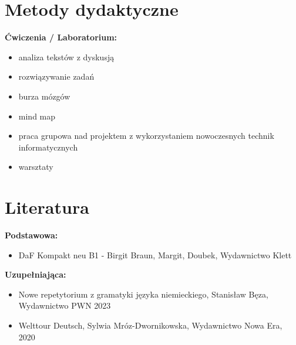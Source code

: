 \documentclass[12pt, a4paper]{article}
\begin{document}
\section{Metody dydaktyczne}

\textbf{Ćwiczenia / Laboratorium:}
\begin{itemize}
  \item analiza tekstów z dyskusją
  \item rozwiązywanie zadań
  \item burza mózgów
  \item mind map
  \item praca grupowa nad projektem z wykorzystaniem nowoczesnych technik informatycznych
  \item warsztaty
\end{itemize}
\vspace{4pt}


\section{Literatura}

\textbf{Podstawowa:}
\begin{itemize}
  \item DaF Kompakt neu B1 - Birgit Braun, Margit, Doubek, Wydawnictwo Klett
\end{itemize}

\textbf{Uzupełniająca:}
\begin{itemize}
  \item Nowe repetytorium z gramatyki języka niemieckiego, Stanisław Bęza, Wydawnictwo PWN 2023
  \item Welttour Deutsch, Sylwia Mróz-Dwornikowska, Wydawnictwo Nowa Era, 2020
\end{itemize}
\end{document}
